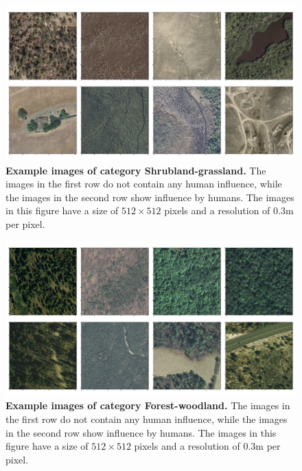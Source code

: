 \begin{figure}[h!]
	\centering
	\captionsetup{width=1\linewidth}
	\includegraphics[width=1\textwidth]{Figures/shrubland-grassland_sample.pdf}
	\caption{\textbf{Example images of category Shrubland-grassland.} The images in the first row do not contain any human influence, while the images in the second row show influence by humans. The images in this figure have a size of $512\times512$ pixels and a resolution of $0.3$m per pixel.}
	\label{fig:shrubland-sample}
\end{figure}

\begin{figure}[h!]
	\centering
	\captionsetup{width=1\linewidth}
	\includegraphics[width=1\textwidth]{Figures/forest-woodland_sample.pdf}
	\caption{\textbf{Example images of category Forest-woodland.} The images in the first row do not contain any human influence, while the images in the second row show influence by humans. The images in this figure have a size of $512\times512$ pixels and a resolution of $0.3$m per pixel.}
	\label{fig:forest-sample}
\end{figure}

